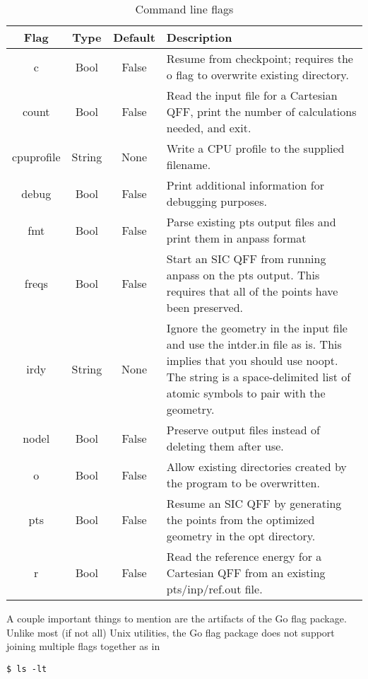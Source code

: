 \documentclass{article}
\begin{document}
\begin{table}[ht]
  \centering
  \caption{Command line flags}
  \label{tab:flags}
  \begin{tabular}{|c|c|c|p{}|}
    \hline
    Flag & Type & Default & Description \\
    \hline
    c & Bool & False & Resume from checkpoint; requires the o flag to overwrite existing directory.\\
    count & Bool & False & Read the input file for a Cartesian QFF,
                           print the number of calculations needed, and exit.\\
    cpuprofile & String & None & Write a CPU profile to the supplied filename.\\
    debug & Bool & False & Print additional information for debugging purposes.\\
    fmt & Bool & False & Parse existing pts output files and print them in anpass format\\
    freqs & Bool & False & Start an SIC QFF from running anpass on the pts output.
                           This requires that all of the points have been preserved.\\
    irdy & String & None & Ignore the geometry in the input file and use the intder.in file
                           as is. This implies that you should use noopt. The string is a
                           space-delimited list of atomic symbols to pair with the geometry.\\
    nodel & Bool & False & Preserve output files instead of deleting them after use.\\
    o & Bool & False & Allow existing directories created by the program to be overwritten.\\
    pts & Bool & False & Resume an SIC QFF by generating the points from
                         the optimized geometry in the opt directory.\\
    r & Bool & False & Read the reference energy for a Cartesian QFF from
                       an existing pts/inp/ref.out file.\\
    \hline
  \end{tabular}
\end{table}

A couple important things to mention are the artifacts of the Go flag
package. Unlike most (if not all) Unix utilities, the Go flag package
does not support joining multiple flags together as in

\begin{verbatim}
$ ls -lt
\end{verbatim}
\end{document}

